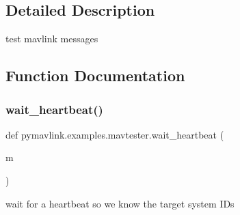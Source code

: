 \subsection{Detailed Description}
\begin{DoxyVerb}test mavlink messages
\end{DoxyVerb}
 

\subsection{Function Documentation}
\mbox{\label{namespacepymavlink_1_1examples_1_1mavtester_ae1bf609bf03b42c2ed744e90dbb30db3}} 
\subsubsection{\texorpdfstring{wait\+\_\+heartbeat()}{wait\_heartbeat()}}
{\footnotesize\ttfamily def pymavlink.\+examples.\+mavtester.\+wait\+\_\+heartbeat (\begin{DoxyParamCaption}\item[{}]{m }\end{DoxyParamCaption})}

\begin{DoxyVerb}wait for a heartbeat so we know the target system IDs\end{DoxyVerb}
 